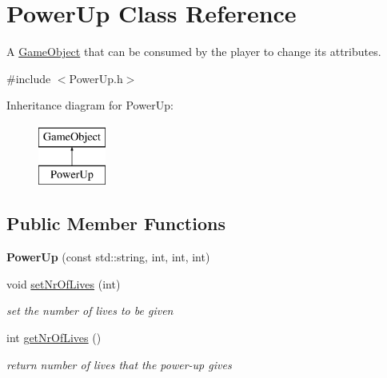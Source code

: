 \hypertarget{class_power_up}{}\section{Power\+Up Class Reference}
\label{class_power_up}


A \mbox{\hyperlink{class_game_object}{Game\+Object}} that can be consumed by the player to change its attributes.  




{\ttfamily \#include $<$Power\+Up.\+h$>$}

Inheritance diagram for Power\+Up\+:\begin{figure}[H]
\begin{center}
\leavevmode
\includegraphics[height=2.000000cm]{class_power_up}
\end{center}
\end{figure}
\subsection*{Public Member Functions}
\begin{DoxyCompactItemize}
\item 
\mbox{\label{class_power_up_a1146d214489e9f66e80b0d9905ce6aef}} 
{\bfseries Power\+Up} (const std\+::string, int, int, int)
\item 
\mbox{\label{class_power_up_a0358e4edc1c61e26e0c7018b3ebef118}} 
void \mbox{\hyperlink{class_power_up_a0358e4edc1c61e26e0c7018b3ebef118}{set\+Nr\+Of\+Lives}} (int)
\begin{DoxyCompactList}\small\item\em set the number of lives to be given \end{DoxyCompactList}\item 
\mbox{\label{class_power_up_a20b1f2fa6a06891bdac68103f16816f1}} 
int \mbox{\hyperlink{class_power_up_a20b1f2fa6a06891bdac68103f16816f1}{get\+Nr\+Of\+Lives}} ()
\begin{DoxyCompactList}\small\item\em return number of lives that the power-\/up gives \end{DoxyCompactList}\end{DoxyCompactItemize}


